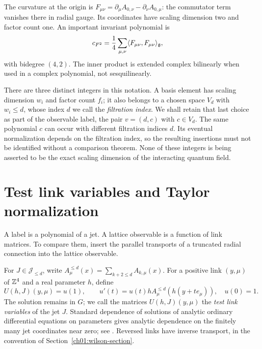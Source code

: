 The curvature at the origin is
$F_{\mu\nu}=\partial_\mu A_{0,\nu}-\partial_\nu A_{0,\mu}$: the
commutator term vanishes there in radial gauge. Its coordinates have scaling dimension
two and factor count one. An important invariant polynomial is
\begin{equation}
 c_{F^2}=\frac14\sum_{\mu,\nu}
                 \langle F_{\mu\nu},F_{\mu\nu}\rangle_{\mathfrak g},
 \label{ch02:curvature-square}
\end{equation}
with bidegree $(4,2)$. The inner product is extended complex bilinearly when
used in a complex polynomial, not sesquilinearly.

There are three distinct integers in this notation. A basis element has
scaling dimension $w_i$ and factor count $f_i$; it also belongs to a chosen space
$V_d$ with $w_i\le d$, whose index $d$ we call the \emph{filtration index}. We shall retain that last choice as part of the
observable label, the pair $v=(d,c)$ with $c\in V_d$. The same polynomial
$c$ can occur with different filtration indices $d$. Its eventual normalization depends on
the filtration index, so the resulting insertions must not be identified without a
comparison theorem. None of these integers is being asserted to be the
exact scaling dimension of the interacting quantum field.

\section{Test link variables and Taylor normalization}
\label{ch02:taylor-section}

A label is a polynomial of a jet. A lattice observable is a function of
link matrices. To compare them, insert the parallel transports of a
truncated radial connection into the lattice observable.

For $J\in\mathcal J_{\le d}$, write
$A^{\le d}_\mu(x)=\sum_{k+2\le d}A_{k,\mu}(x)$. For a positive link
$(y,\mu)$ of $\mathbb Z^4$ and a real parameter $h$, define
\begin{equation}
 U(h,J)(y,\mu)=u(1),\qquad
 u'(t)=u(t)h A^{\le d}_\mu(h(y+te_\mu)),\quad u(0)=1.
 \label{ch02:test-holonomy}
\end{equation}
The solution remains in $G$; we call the matrices $U(h,J)(y,\mu)$ the \emph{test link variables} of the jet $J$. Standard dependence of solutions of analytic
ordinary differential equations on parameters gives analytic dependence on
the finitely many jet coordinates near zero; see
\cite{Teschl2012}. Reversed links have inverse transport, in the convention
of Section~\ref{ch01:wilson-section}.

